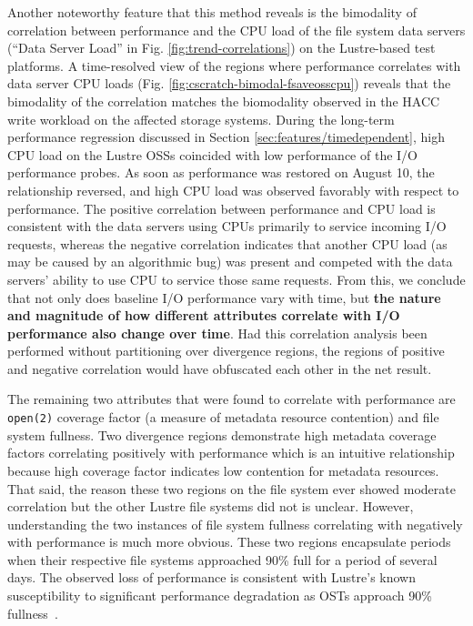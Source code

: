 
Another noteworthy feature that this method reveals is the bimodality of correlation between performance and the CPU load of the file system data servers (``Data Server Load'' in Fig. \ref{fig:trend-correlations}) on the Lustre-based test platforms.
A time-resolved view of the regions where performance correlates with data server CPU loads (Fig. \ref{fig:cscratch-bimodal-fsaveosscpu}) reveals that the bimodality of the correlation matches the biomodality observed in the HACC write workload on the affected storage systems.
During the long-term performance regression discussed in Section \ref{sec:features/timedependent}, high CPU load on the Lustre OSSs coincided with low performance of the I/O performance probes.
As soon as performance was restored on August 10, the relationship reversed, and high CPU load was observed favorably with respect to performance.
The positive correlation between performance and CPU load is consistent with the data servers using CPUs primarily to service incoming I/O requests, whereas the negative correlation indicates that another CPU load (as may be caused by an algorithmic bug) was present and competed with the data servers' ability to use CPU to service those same requests.
From this, we conclude that not only does baseline I/O performance vary with time, but \textbf{the nature and magnitude of how different attributes correlate with I/O performance also change over time}.
Had this correlation analysis been performed without partitioning over divergence regions, the regions of positive and negative correlation would have obfuscated each other in the net result.

The remaining two attributes that were found to correlate with performance are \texttt{open(2)} coverage factor (a measure of metadata resource contention) and file system fullness.
Two divergence regions demonstrate high metadata coverage factors correlating positively with performance which is an intuitive relationship because high coverage factor indicates low contention for metadata resources.
That said, the reason these two regions on the \edison \scratchtwo file system ever showed moderate correlation but the other Lustre file systems did not is unclear.
However, understanding the two instances of file system fullness correlating with negatively with performance is much more obvious.
These two regions encapsulate periods when their respective file systems approached 90\% full for a period of several days.
The observed loss of performance is consistent with Lustre's known susceptibility to significant performance degradation as OSTs approach 90\% fullness~\cite{oral2014best,Lockwood2017}.





